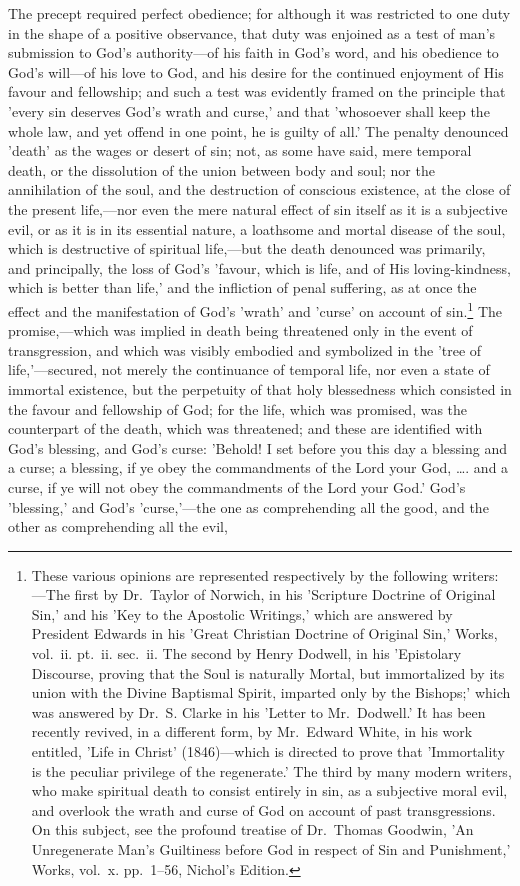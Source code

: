 \documentclass[
]{book}
\begin{document}
The precept required perfect obedience; for although it was restricted to one duty in the shape of a positive observance, that duty was enjoined as a test of man's submission to God's authority---of his faith in God's word, and his obedience to God's will---of his love to God, and his desire for the continued enjoyment of His favour and fellowship; and such a test was evidently framed on the principle that 'every sin deserves God's wrath and curse,' and that 'whosoever shall keep the whole law, and yet offend in one point, he is guilty of all.' The penalty denounced 'death' as the wages or desert of sin; not, as some have said, mere temporal death, or the dissolution of the union between body and soul; nor the annihilation of the soul, and the destruction of conscious existence, at the close of the present life,---nor even the mere natural effect of sin itself as it is a subjective evil, or as it is in its essential nature, a loathsome and mortal disease of the soul, which is destructive of spiritual life,---but the death denounced was primarily, and principally, the loss of God's 'favour, which is life, and of His loving-kindness, which is better than life,' and the infliction of penal suffering, as at once the effect and the manifestation of God's 'wrath' and 'curse' on account of sin.\footnote{These various opinions are represented respectively by the following writers:---The first by Dr.~Taylor of Norwich, in his 'Scripture Doctrine of Original Sin,' and his 'Key to the Apostolic Writings,' which are answered by President Edwards in his 'Great Christian Doctrine of Original Sin,' Works, vol.~ii. pt.~ii. sec.~ii. The second by Henry Dodwell, in his 'Epistolary Discourse, proving that the Soul is naturally Mortal, but immortalized by its union with the Divine Baptismal Spirit, imparted only by the Bishops;' which was answered by Dr.~S. Clarke in his 'Letter to Mr.~Dodwell.' It has been recently revived, in a different form, by Mr.~Edward White, in his work entitled, 'Life in Christ' (1846)---which is directed to prove that 'Immortality is the peculiar privilege of the regenerate.' The third by many modern writers, who make spiritual death to consist entirely in sin, as a subjective moral evil, and overlook the wrath and curse of God on account of past transgressions. On this subject, see the profound treatise of Dr.~Thomas Goodwin, 'An Unregenerate Man's Guiltiness before God in respect of Sin and Punishment,' Works, vol.~x. pp.~1--56, Nichol's Edition.} The promise,---which was implied in death being threatened only in the event of transgression, and which was visibly embodied and symbolized in the 'tree of life,'---secured, not merely the continuance of temporal life, nor even a state of immortal existence, but the perpetuity of that holy blessedness which consisted in the favour and fellowship of God; for the life, which was promised, was the counterpart of the death, which was threatened; and these are identified with God's blessing, and God's curse: 'Behold! I set before you this day a blessing and a curse; a blessing, if ye obey the commandments of the Lord your God, \ldots. and a curse, if ye will not obey the commandments of the Lord your God.' God's 'blessing,' and God's 'curse,'---the one as comprehending all the good, and the other as comprehending all the evil, 
\end{document}
